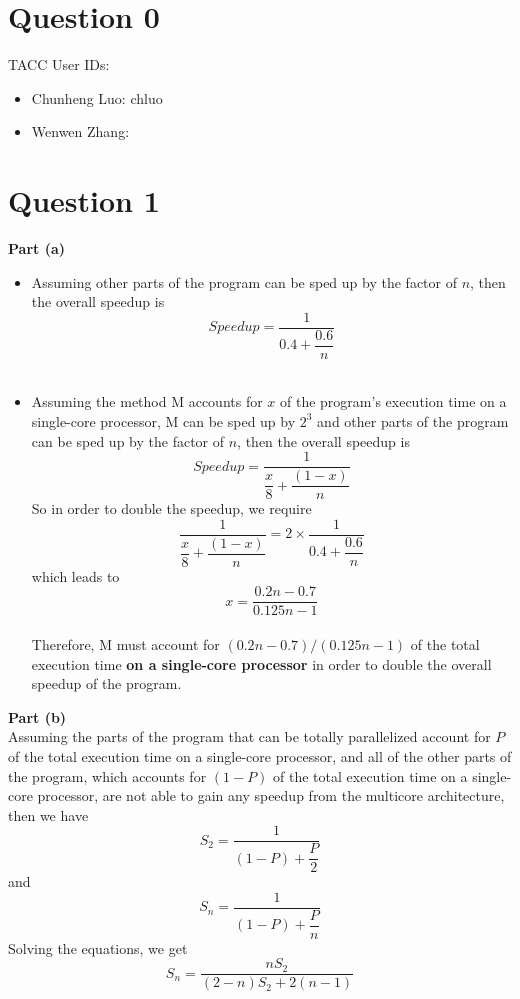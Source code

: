\documentclass[12pt]{article}
\begin{document}
\maketitle

\section*{Question 0} 
TACC User IDs:
\begin{itemize}
\item Chunheng Luo: chluo \\
\item Wenwen Zhang:        \\
\end{itemize}

\section*{Question 1}

\textbf{Part (a)}

\begin{itemize} 
\item Assuming other parts of the program can be sped up by the factor of $n$, then the overall speedup is $$Speedup = \dfrac{1}{0.4+\dfrac{0.6}{n}}$$  \\
\item Assuming the method M accounts for $x$ of the program's execution time on a single-core processor, M can be sped up by $2^3$ and other parts of the program can be sped up by the factor of $n$, then the overall speedup is $$Speedup = \dfrac{1}{\dfrac{x}{8} + \dfrac{(1-x)}{n}}$$
So in order to double the speedup, we require $$\dfrac{1}{ \dfrac{x}{8} + \dfrac{(1-x)}{n}} = 2\times\dfrac{1}{0.4+\dfrac{0.6}{n}}$$ 
which leads to $$x = \dfrac{0.2n - 0.7}{0.125n - 1}$$ \\
Therefore, M must account for $(0.2n - 0.7)/(0.125n - 1)$ of the total execution time \textbf{on a single-core processor} in order to double the overall speedup of the program. 
\end{itemize}

\textbf{Part (b)} \\ 

Assuming the parts of the program that can be totally parallelized account for $P$ of the total execution time on a single-core processor, and all of the other parts of the program, which accounts for $(1-P)$ of the total execution time on a single-core processor, are not able to gain any speedup from the multicore architecture, then we have 
$$S_2 = \dfrac{1}{(1-P) + \dfrac{P}{2}}$$ and $$S_n = \dfrac{1}{(1-P) + \dfrac{P}{n}}$$
Solving the equations, we get $$S_n = \dfrac{nS_2}{(2-n)S_2 + 2(n-1)}$$ 
\end{document}

